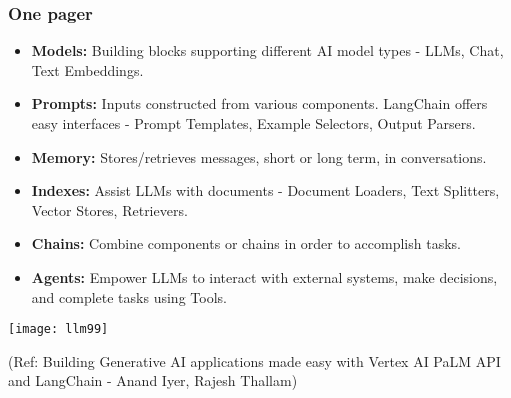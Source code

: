 \begin{frame}[fragile]\frametitle{One pager}

\begin{itemize}
\item \textbf{Models:} Building blocks supporting different AI model types - LLMs, Chat, Text Embeddings.
\item \textbf{Prompts:} Inputs constructed from various components. LangChain offers easy interfaces - Prompt Templates, Example Selectors, Output Parsers.
\item \textbf{Memory:} Stores/retrieves messages, short or long term, in conversations.
\item \textbf{Indexes:} Assist LLMs with documents - Document Loaders, Text Splitters, Vector Stores, Retrievers.
\item \textbf{Chains:} Combine components or chains in order to accomplish tasks.
\item \textbf{Agents:} Empower LLMs to interact with external systems, make decisions, and complete tasks using Tools.
\end{itemize}

\begin{center}
\texttt{[image: llm99]}
\end{center}


{\tiny (Ref: Building Generative AI applications made easy with Vertex AI PaLM API and LangChain  - Anand Iyer, Rajesh Thallam)}

\end{frame}

